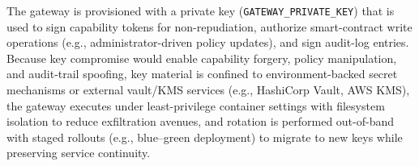 \documentclass[pdflatex,sn-mathphys-num]{sn-jnl}
\begin{document}







The gateway is provisioned with a private key (\texttt{GATEWAY\_PRIVATE\_KEY}) that is used to sign capability tokens for non-repudiation, authorize smart-contract write operations (e.g., administrator-driven policy updates), and sign audit-log entries. Because key compromise would enable capability forgery, policy manipulation, and audit-trail spoofing, key material is confined to environment-backed secret mechanisms or external vault/KMS services (e.g., HashiCorp Vault, AWS KMS), the gateway executes under least-privilege container settings with filesystem isolation to reduce exfiltration avenues, and rotation is performed out-of-band with staged rollouts (e.g., blue--green deployment) to migrate to new keys while preserving service continuity.
\end{document}
